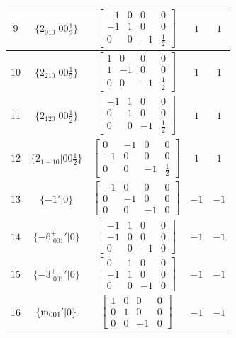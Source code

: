\documentclass[fleqn,8pt]{jsarticle}
\begin{document}
\begin{longtable}{ccccc}
$ 9 $ & $ \{2{}_{010}|0 0 \frac{1}{2}\} $ & $ \begin{bmatrix} -1 & 0 & 0 & 0 \\ -1 & 1 & 0 & 0 \\ 0 & 0 & -1 & \frac{1}{2} \end{bmatrix} $ & $ 1 $ & $ 1 $ \\ \hline
$ 10 $ & $ \{2{}_{210}|0 0 \frac{1}{2}\} $ & $ \begin{bmatrix} 1 & 0 & 0 & 0 \\ 1 & -1 & 0 & 0 \\ 0 & 0 & -1 & \frac{1}{2} \end{bmatrix} $ & $ 1 $ & $ 1 $ \\ \hline
$ 11 $ & $ \{2{}_{120}|0 0 \frac{1}{2}\} $ & $ \begin{bmatrix} -1 & 1 & 0 & 0 \\ 0 & 1 & 0 & 0 \\ 0 & 0 & -1 & \frac{1}{2} \end{bmatrix} $ & $ 1 $ & $ 1 $ \\ \hline
$ 12 $ & $ \{2{}_{1-10}|0 0 \frac{1}{2}\} $ & $ \begin{bmatrix} 0 & -1 & 0 & 0 \\ -1 & 0 & 0 & 0 \\ 0 & 0 & -1 & \frac{1}{2} \end{bmatrix} $ & $ 1 $ & $ 1 $ \\ \hline
$ 13 $ & $ \{-1{}'|0\} $ & $ \begin{bmatrix} -1 & 0 & 0 & 0 \\ 0 & -1 & 0 & 0 \\ 0 & 0 & -1 & 0 \end{bmatrix} $ & $ -1 $ & $ -1 $ \\ \hline
$ 14 $ & $ \{-6^{+}_{\,\,001}{}'|0\} $ & $ \begin{bmatrix} -1 & 1 & 0 & 0 \\ -1 & 0 & 0 & 0 \\ 0 & 0 & -1 & 0 \end{bmatrix} $ & $ -1 $ & $ -1 $ \\ \hline
$ 15 $ & $ \{-3^{+}_{\,\,001}{}'|0\} $ & $ \begin{bmatrix} 0 & 1 & 0 & 0 \\ -1 & 1 & 0 & 0 \\ 0 & 0 & -1 & 0 \end{bmatrix} $ & $ -1 $ & $ -1 $ \\ \hline
$ 16 $ & $ \{{\rm m}_{001}{}'|0\} $ & $ \begin{bmatrix} 1 & 0 & 0 & 0 \\ 0 & 1 & 0 & 0 \\ 0 & 0 & -1 & 0 \end{bmatrix} $ & $ -1 $ & $ -1 $ \\ \hline

\end{longtable}
\end{document}
